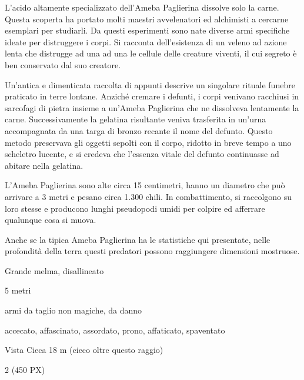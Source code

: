 \begin{multicols}{2}
{L'acido altamente specializzato dell'Ameba Paglierina dissolve solo la carne. Questa scoperta ha portato molti maestri avvelenatori ed alchimisti a cercarne esemplari per studiarli. Da questi esperimenti sono nate diverse armi specifiche ideate per distruggere i corpi. Si racconta dell'esistenza di un veleno ad azione lenta che distrugge ad una ad una le cellule delle creature viventi, il cui segreto è ben conservato dal suo creatore.

Un'antica e dimenticata raccolta di appunti descrive un singolare rituale funebre praticato in terre lontane. Anziché cremare i defunti, i corpi venivano racchiusi in sarcofagi di pietra insieme a un'Ameba Paglierina che ne dissolveva lentamente la carne. Successivamente la gelatina risultante veniva trasferita in un'urna accompagnata da una targa di bronzo recante il nome del defunto. Questo metodo preservava gli oggetti sepolti con il corpo, ridotto in breve tempo a uno scheletro lucente, e si credeva che l'essenza vitale del defunto continuasse ad abitare nella gelatina.

L'Ameba Paglierina sono alte circa 15 centimetri, hanno un diametro che può arrivare a 3 metri e pesano circa 1.300 chili. In combattimento, si raccolgono su loro stesse e producono lunghi pseudopodi umidi per colpire ed afferrare qualunque cosa si muova.

Anche se la tipica Ameba Paglierina ha le statistiche qui presentate, nelle profondità della terra questi predatori possono raggiungere dimensioni mostruose.


\begin{description}[noitemsep, topsep=0pt, parsep=0pt, partopsep=0pt, itemsep=1pt, leftmargin=2.35cm,  labelwidth=2.2cm, itemindent=0cm, listparindent=0pt] %
\setlength{\baselineskip}{10pt}
\item[\textbf{Taglia/Tipo}] Grande melma, disallineato
\item[\textbf{Caratt.}] 
\item[\textbf{Punti Ferita}] 
\item[\textbf{Movimento}] 5 metri
\item[\textbf{Tiri Salvez.}] 
\item[\textbf{Imm. Danni}] armi da taglio non magiche, da danno
\item[\textbf{Immunità}] accecato, affascinato, assordato, prono, affaticato, spaventato
\item[\textbf{Sensi}] Vista Cieca 18 m (cieco oltre questo raggio)
\item[\textbf{Sfida}] 2 (450 PX)
\end{description}
\smallskip

}
\end{multicols}
